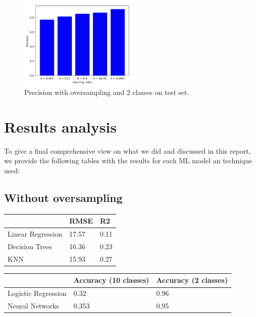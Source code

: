 \documentclass{article}
\begin{document}
\begin{figure}[h!]
    \centering
    \includegraphics[width=0.5\textwidth]{precision_binary_oversampling_nn.png}
    \caption{\label{fig:binary_precision_oversampling}Precision with oversampling and 2 classes on test set.}
\end{figure}
\newpage


\section{Results analysis}
To give a final comprehensive view on what we did and discussed in this report, we provide the following tables with the results for each ML model an technique used:

\subsection{Without oversampling}

\begin{table}[h!]
    \centering
    \begin{tabular}{l|l|l|}
    \cline{2-3}
                                            & RMSE  & R2   \\ \hline
    \multicolumn{1}{|l|}{Linear Regression} & 17.57 & 0.11 \\ \hline
    \multicolumn{1}{|l|}{Decision Trees}    & 16.36 & 0.23 \\ \hline
    \multicolumn{1}{|l|}{KNN}               & 15.93 & 0.27 \\ \hline
\end{tabular}
\end{table}

\begin{table}[h!]
    \centering
    \begin{tabular}{l|l|l|}
    \cline{2-3}
                                              & Accuracy (10 classes) & Accuracy (2 classes) \\ \hline
    \multicolumn{1}{|l|}{Logistic Regression} & 0.32                  & 0.96                 \\ \hline
    \multicolumn{1}{|l|}{Neural Networks}     & 0.353                 & 0.95                 \\ \hline
\end{tabular}
\end{table}
\end{document}
